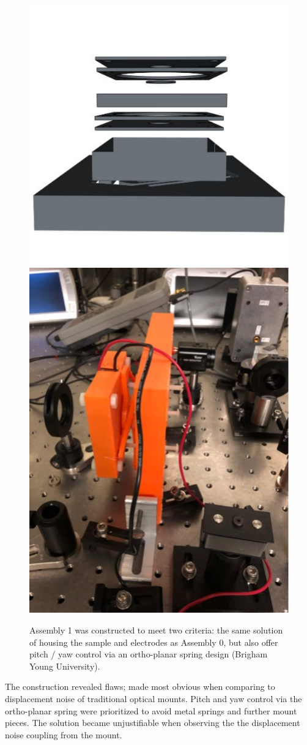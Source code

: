 \begin{figure}[!ht]
    \begin{subcaptiongroup}
	    \includegraphics[width=.5\textwidth]{figs/ALGAAS/assemblies/assembly1/assembly1_dissassembled.pdf}
	    \label{A1disassembled}
	    \includegraphics[width=.5\textwidth]{figs/ALGAAS/assemblies/assembly1/assembly1_flaw.pdf}
	    \label{A1flaw}
    \end{subcaptiongroup}
    \caption{Assembly 1 was constructed to meet two criteria: the same solution of housing the sample and electrodes as Assembly 0, but also offer pitch / yaw control via an ortho-planar spring design (Brigham Young University).}
    \label{fig:A1pt0}
\end{figure}
\FloatBarrier


The construction revealed flaws; made most obvious when comparing to displacement noise of traditional optical mounts. Pitch and yaw control via the ortho-planar spring were prioritized to avoid metal springs and further mount pieces. The solution became unjustifiable when observing the the displacement noise coupling from the mount.


